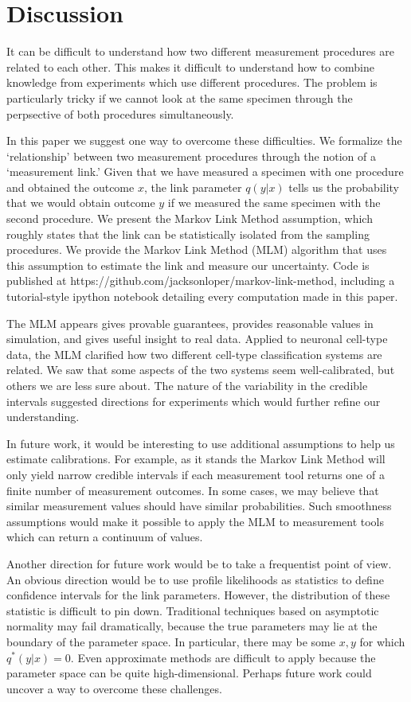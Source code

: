 \section{Discussion}

It can be difficult to understand how two different measurement procedures are related to each other.  This makes it difficult to understand how to combine knowledge from experiments which use different procedures.  The problem is particularly tricky if we cannot look at the same specimen through the perpsective of both procedures simultaneously.

In this paper we suggest one way to overcome these difficulties.  We formalize the `relationship' between two measurement procedures through the notion of a `measurement link.'  Given that we have measured a specimen with one procedure and obtained the outcome $x$, the link parameter $q(y|x)$ tells us the probability that we would obtain outcome $y$ if we measured the same specimen with the second procedure.  We present the Markov Link Method assumption, which roughly states that the link can be statistically isolated from the sampling procedures.  We provide the Markov Link Method (MLM) algorithm that uses this assumption to estimate the link and measure our uncertainty.  Code is published at https://github.com/jacksonloper/markov-link-method, including a tutorial-style ipython notebook detailing every computation made in this paper.

The MLM appears gives provable guarantees, provides reasonable values in simulation, and gives useful insight to real data.  Applied to neuronal cell-type data, the MLM clarified how two different cell-type classification systems are related.  We saw that some aspects of the two systems seem well-calibrated, but others we are less sure about.  The nature of the variability in the credible intervals suggested directions for experiments which would further refine our understanding.  

In future work, it would be interesting to use additional assumptions to help us estimate calibrations.  For example, as it stands the Markov Link Method will only yield narrow credible intervals if each measurement tool returns one of a finite number of measurement outcomes.  In some cases, we may believe that similar measurement values should have similar probabilities.  Such smoothness assumptions would make it possible to apply the MLM to measurement tools which can return a continuum of values.   

Another direction for future work would be to take a frequentist point of view.  An obvious direction would be to use profile likelihoods as statistics to define confidence intervals for the link parameters.  However, the distribution of these statistic is difficult to pin down.  Traditional techniques based on asymptotic normality may fail dramatically, because the true parameters may lie at the boundary of the parameter space.  In particular, there may be some $x,y$ for which $q^*(y|x)=0$.  Even approximate methods are difficult to apply because the parameter space can be quite high-dimensional.  Perhaps future work could uncover a way to overcome these challenges.

